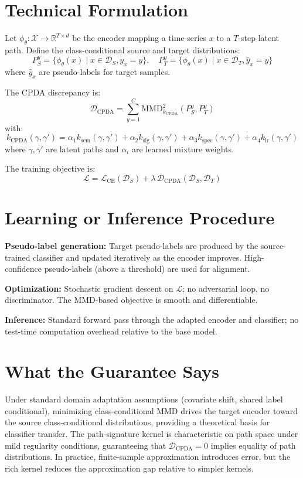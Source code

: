 \documentclass[10pt,twocolumn]{article}
\begin{document}
\section{Technical Formulation}

Let $\phi_\theta: \mathcal{X} \to \mathbb{R}^{T \times d}$ be the encoder mapping
a time-series $x$ to a $T$-step latent path. Define the class-conditional source
and target distributions:
\[
P^y_S = \{\phi_\theta(x) \mid x \in \mathcal{D}_S, y_x = y\}, \quad
P^y_T = \{\phi_\theta(x) \mid x \in \mathcal{D}_T, \hat{y}_x = y\}
\]
where $\hat{y}_x$ are pseudo-labels for target samples.

The CPDA discrepancy is:
\[
\mathcal{D}_{\mathrm{CPDA}} = \sum_{y=1}^{C} \mathrm{MMD}^2_{k_{\mathrm{CPDA}}}(P^y_S, P^y_T)
\]
with:
\[
k_{\mathrm{CPDA}}(\gamma, \gamma') =
  \alpha_1 k_{\mathrm{sem}}(\gamma, \gamma') +
  \alpha_2 k_{\mathrm{sig}}(\gamma, \gamma') +
  \alpha_3 k_{\mathrm{spec}}(\gamma, \gamma') +
  \alpha_4 k_{\mathrm{lr}}(\gamma, \gamma')
\]
where $\gamma, \gamma'$ are latent paths and $\alpha_i$ are learned mixture weights.

The training objective is:
\[
\mathcal{L} = \mathcal{L}_{\mathrm{CE}}(\mathcal{D}_S) +
              \lambda\,\mathcal{D}_{\mathrm{CPDA}}(\mathcal{D}_S, \mathcal{D}_T)
\]

\section{Learning or Inference Procedure}

\textbf{Pseudo-label generation:} Target pseudo-labels are produced by the
source-trained classifier and updated iteratively as the encoder improves.
High-confidence pseudo-labels (above a threshold) are used for alignment.

\textbf{Optimization:} Stochastic gradient descent on $\mathcal{L}$; no adversarial
loop, no discriminator. The MMD-based objective is smooth and differentiable.

\textbf{Inference:} Standard forward pass through the adapted encoder and classifier;
no test-time computation overhead relative to the base model.

\section{What the Guarantee Says}

Under standard domain adaptation assumptions (covariate shift, shared label
conditional), minimizing class-conditional MMD drives the target encoder toward
the source class-conditional distributions, providing a theoretical basis for
classifier transfer. The path-signature kernel is characteristic on path space
under mild regularity conditions, guaranteeing that $\mathcal{D}_{\mathrm{CPDA}} = 0$
implies equality of path distributions. In practice, finite-sample approximation
introduces error, but the rich kernel reduces the approximation gap relative
to simpler kernels.
\end{document}
